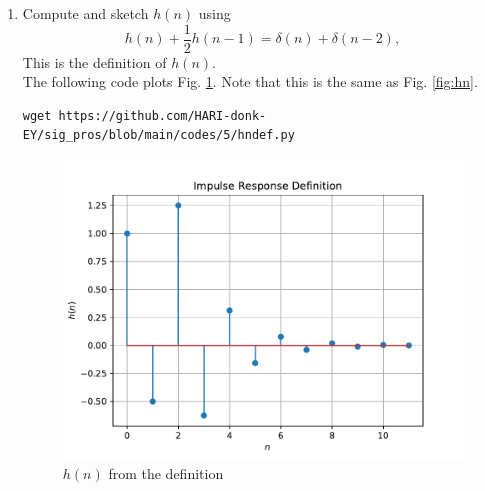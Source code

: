\documentclass[journal,12pt,twocolumn]{IEEEtran}
\renewcommand\thesection{\arabic{section}}
\begin{document}
\begin{enumerate}[label=\thesection.\arabic*]
\item 
Compute and sketch $h(n)$ using 
\begin{equation}
\label{eq:iir_filter_h}
h(n) + \frac{1}{2}h(n-1) = \delta(n) + \delta(n-2), 
\end{equation}
%
This is the definition of $h(n)$.
\\
\solution The following code plots Fig. \ref{fig:hndef}. Note that this is the same as Fig. 
\ref{fig:hn}. 
%
\begin{lstlisting}
wget https://github.com/HARI-donk-EY/sig_pros/blob/main/codes/5/hndef.py
\end{lstlisting}
\begin{figure}[!ht]
\centering
\includegraphics[width=\columnwidth]{./figs/hndef}
\caption{$h(n)$ from the definition}
\label{fig:hndef}
\end{figure}



\end{enumerate}
\end{document}
